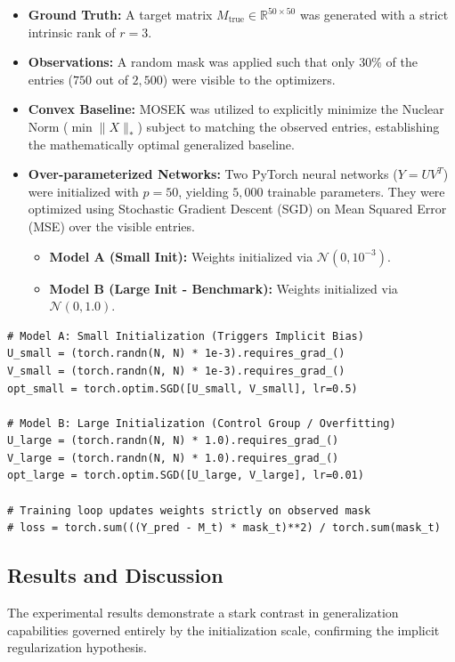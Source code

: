 \begin{itemize}
    \item \textbf{Ground Truth:} A target matrix $M_{\text{true}} \in \mathbb{R}^{50 \times 50}$ was generated with a strict intrinsic rank of $r=3$.
    \item \textbf{Observations:} A random mask was applied such that only $30\%$ of the entries ($750$ out of $2,500$) were visible to the optimizers.
    \item \textbf{Convex Baseline:} MOSEK was utilized to explicitly minimize the Nuclear Norm ($\min \|X\|_*$) subject to matching the observed entries, establishing the mathematically optimal generalized baseline.
    \item \textbf{Over-parameterized Networks:} Two PyTorch neural networks ($Y = UV^T$) were initialized with $p=50$, yielding $5,000$ trainable parameters. They were optimized using Stochastic Gradient Descent (SGD) on Mean Squared Error (MSE) over the visible entries.
    \begin{itemize}
        \item \textbf{Model A (Small Init):} Weights initialized via $\mathcal{N}(0, 10^{-3})$.
        \item \textbf{Model B (Large Init - Benchmark):} Weights initialized via $\mathcal{N}(0, 1.0)$.
    \end{itemize}
\end{itemize}

\begin{lstlisting}[caption={PyTorch SGD Setup for Implicit Regularization}]
# Model A: Small Initialization (Triggers Implicit Bias)
U_small = (torch.randn(N, N) * 1e-3).requires_grad_()
V_small = (torch.randn(N, N) * 1e-3).requires_grad_()
opt_small = torch.optim.SGD([U_small, V_small], lr=0.5)

# Model B: Large Initialization (Control Group / Overfitting)
U_large = (torch.randn(N, N) * 1.0).requires_grad_()
V_large = (torch.randn(N, N) * 1.0).requires_grad_()
opt_large = torch.optim.SGD([U_large, V_large], lr=0.01)

# Training loop updates weights strictly on observed mask
# loss = torch.sum(((Y_pred - M_t) * mask_t)**2) / torch.sum(mask_t)
\end{lstlisting}

\subsection{Results and Discussion}
The experimental results demonstrate a stark contrast in generalization capabilities governed entirely by the initialization scale, confirming the implicit regularization hypothesis.

